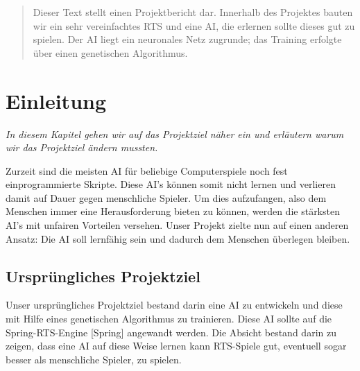 \documentclass[
	12pt,
	a4paper,
	BCOR10mm,
	DIV14,
	headsepline,
	usegeometry,
]{scrreprt}
\begin{document}
\restoregeometry


\tableofcontents

\begin{abstract}

Dieser Text stellt einen Projektbericht dar. 
Innerhalb des Projektes bauten wir ein sehr vereinfachtes RTS und eine AI, die erlernen sollte dieses gut zu spielen. 
Der AI liegt ein neuronales Netz zugrunde; das Training erfolgte über einen genetischen Algorithmus.
\end{abstract}


\chapter{Einleitung}
\label{Einleitung}

\textit{%
In diesem Kapitel gehen wir auf das Projektziel näher ein und erläutern warum wir das Projektziel ändern mussten.
}

\bigskip

Zurzeit sind die meisten AI für beliebige Computerspiele noch fest einprogrammierte Skripte. Diese AI's können somit nicht lernen und verlieren damit auf Dauer gegen menschliche Spieler. Um dies aufzufangen, also dem Menschen immer eine Herausforderung bieten zu können, werden die stärksten AI's mit unfairen Vorteilen versehen. Unser Projekt zielte nun auf einen anderen Ansatz: Die AI soll lernfähig sein und dadurch dem Menschen überlegen bleiben.

\section{Ursprüngliches Projektziel}

Unser ursprüngliches Projektziel bestand darin eine AI zu entwickeln und diese mit Hilfe eines genetischen Algorithmus zu trainieren. Diese AI sollte auf die Spring-RTS-Engine [Spring] angewandt werden. Die Absicht bestand darin zu zeigen, dass eine AI auf diese Weise lernen kann RTS-Spiele gut, eventuell sogar besser als menschliche Spieler, zu spielen.\\
\end{document}
